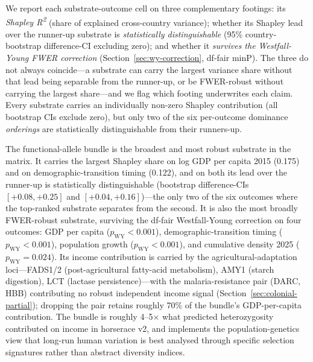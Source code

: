\documentclass[11pt,letterpaper]{article}
\begin{document}
\begin{table}[H]
  \centering
  \caption{Shapley R\textsuperscript{2} decomposition across five pre-industrial substrates and six outcomes. Climate bundle treated as a coalition player. Row totals are the per-substrate contribution averaged across outcomes; column totals are the joint marginal R\textsuperscript{2} per outcome.}
  \label{tab:shapley}
  \small
  
\end{table}

We report each substrate-outcome cell on three complementary footings: its \emph{Shapley R\textsuperscript{2}} (share of explained cross-country variance); whether its Shapley lead over the runner-up substrate is \emph{statistically distinguishable} (95\% country-bootstrap difference-CI excluding zero); and whether it \emph{survives the Westfall-Young FWER correction} (Section~\ref{sec:wy-correction}, df-fair minP). The three do not always coincide---a substrate can carry the largest variance share without that lead being separable from the runner-up, or be FWER-robust without carrying the largest share---and we flag which footing underwrites each claim. Every substrate carries an individually non-zero Shapley contribution (all bootstrap CIs exclude zero), but only two of the six per-outcome dominance \emph{orderings} are statistically distinguishable from their runners-up.

The functional-allele bundle is the broadest and most robust substrate in the matrix. It carries the largest Shapley share on log GDP per capita 2015 (0.175) and on demographic-transition timing (0.122), and on both its lead over the runner-up is statistically distinguishable (bootstrap difference-CIs $[+0.08,+0.25]$ and $[+0.04,+0.16]$)---the only two of the six outcomes where the top-ranked substrate separates from the second. It is also the most broadly FWER-robust substrate, surviving the df-fair Westfall-Young correction on four outcomes: GDP per capita ($p_{\text{WY}}<0.001$), demographic-transition timing ($p_{\text{WY}}<0.001$), population growth ($p_{\text{WY}}<0.001$), and cumulative density 2025 ($p_{\text{WY}}=0.024$). Its income contribution is carried by the agricultural-adaptation loci---FADS1/2 (post-agricultural fatty-acid metabolism), AMY1 (starch digestion), LCT (lactase persistence)---with the malaria-resistance pair (DARC, HBB) contributing no robust independent income signal (Section~\ref{sec:colonial-partial}); dropping the pair retains roughly 70\% of the bundle's GDP-per-capita contribution. The bundle is roughly 4--5$\times$ what predicted heterozygosity contributed on income in horserace v2, and implements the population-genetics view that long-run human variation is best analysed through specific selection signatures rather than abstract diversity indices.
\end{document}
